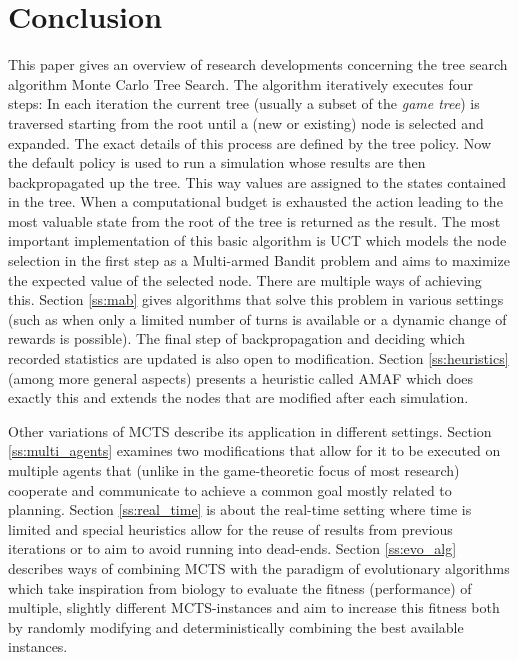 \section{Conclusion}
\label{sec:conclusion}
This paper gives an overview of research developments concerning the tree search algorithm Monte Carlo Tree Search. The algorithm iteratively executes four steps: In each iteration the current tree (usually a subset of the \textit{game tree}) is traversed starting from the root until a (new or existing) node is selected and expanded. The exact details of this process are defined by the tree policy. Now the default policy is used to run a simulation whose results are then backpropagated up the tree. This way values are assigned to the states contained in the tree. When a computational budget is exhausted the action leading to the most valuable state from the root of the tree is returned as the result. The most important implementation of this basic algorithm is UCT which models the node selection in the first step as a Multi-armed Bandit problem and aims to maximize the expected value of the selected node. There are multiple ways of achieving this. Section \ref{ss:mab} gives algorithms that solve this problem in various settings (such as when only a limited number of turns is available or a dynamic change of rewards is possible). The final step of backpropagation and deciding which recorded statistics are updated is also open to modification. Section \ref{ss:heuristics} (among more general aspects) presents a heuristic called AMAF which does exactly this and extends the nodes that are modified after each simulation.

Other variations of MCTS describe its application in different settings. Section \ref{ss:multi_agents} examines two modifications that allow for it to be executed on multiple agents that (unlike in the game-theoretic focus of most research) cooperate and communicate to achieve a common goal mostly related to planning. Section \ref{ss:real_time} is about the real-time setting where time is limited and special heuristics allow for the reuse of results from previous iterations or to aim to avoid running into dead-ends. Section \ref{ss:evo_alg} describes ways of combining MCTS with the paradigm of evolutionary algorithms which take inspiration from biology to evaluate the fitness (performance) of multiple, slightly different MCTS-instances and aim to increase this fitness both by randomly modifying and deterministically combining the best available instances. 

